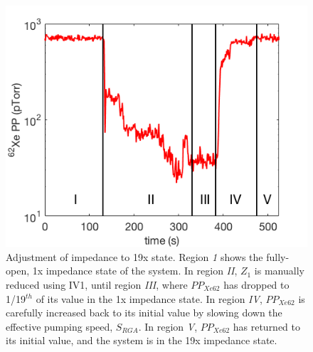 \documentclass[12pt]{article}
\begin{document}
\begin{figure}[h!]
\centering
\includegraphics[width=\textwidth]{Figures/impedance_adjust.png}
\caption{Adjustment of impedance to 19x state. Region \emph{1} shows the fully-open, 1x impedance state of the system. In region \emph{II}, $Z_1$ is manually reduced using IV1, until region \emph{III}, where $PP_{Xe62}$ has dropped to 1/19$^{th}$ of its value in the 1x impedance state. In region \emph{IV}, $PP_{Xe62}$ is carefully increased back to its initial value by slowing down the effective pumping speed, $S_{RGA}$. In region \emph{V}, $PP_{Xe62}$ has returned to its initial value, and the system is in the 19x impedance state. }
\label{fig:imp_adj}
\end{figure}
\end{document}
